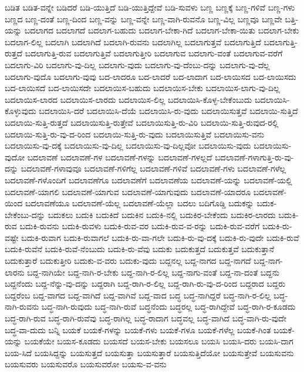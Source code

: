 {ಬಡಿತ
ಬಡಿತ-ವನ್ನೇ
ಬಡಿದರೆ
ಬಡಿ-ಯುತ್ತಿದೆ
ಬಡಿ-ಯುತ್ತಿದ್ದೇವೆ
ಬಡಿ-ಸುವಳು
ಬಣ್ಣ
ಬಣ್ಣಕ್ಕೆ
ಬಣ್ಣ-ಗಳಿವೆ
ಬಣ್ಣ-ಗಳು
ಬಣ್ಣದ
ಬಣ್ಣ-ದಂತೆ
ಬಣ್ಣ-ದಿಂದ
ಬಣ್ಣ-ವನ್ನು
ಬಣ್ಣ-ವನ್ನೇ
ಬಣ್ಣ-ವಾಗಿ-ರುವನೊ
ಬಣ್ಣ-ವಿಲ್ಲ
ಬಣ್ಣವೂ
ಬಣ್ಣವೇ
ಬತ್ತಿ-ಯನ್ನು
ಬದಲಾಗದ
ಬದಲಾಗದೆ
ಬದಲಾಗ-ಬಹುದು
ಬದಲಾಗ-ಬೇಕಾ-ಗಿದೆ
ಬದಲಾಗ-ಬೇಕಾ-ಯಿತು
ಬದಲಾಗ-ಬೇಕು
ಬದಲಾಗ-ಲಿಲ್ಲ
ಬದಲಾಗಿ
ಬದಲಾಗಿದೆ
ಬದಲಾಗಿ-ರುವನು
ಬದಲಾಗಿಲ್ಲ
ಬದಲಾಗುತ್ತವೆ
ಬದಲಾಗುತ್ತಿದೆ
ಬದಲಾಗುತ್ತಿ-ರುತ್ತದೆ
ಬದಲಾಗುತ್ತಿ-ರುವ
ಬದಲಾಗುತ್ತಿವೆ
ಬದಲಾಗುತ್ತೀರಿ
ಬದಲಾಗುವ
ಬದಲಾಗು-ವಂತೆ
ಬದಲಾಗುವ-ವರೆಗೆ
ಬದಲಾಗು-ವಿರಿ
ಬದಲಾಗು-ವು-ದಿಲ್ಲ
ಬದಲಾಗು-ವುದು
ಬದಲಾಗು-ವು-ದೆಂಬು-ದನ್ನು
ಬದಲಾಗು-ವು-ದೆಲ್ಲ
ಬದಲಾಗು-ವುದೊ
ಬದಲಾಗು-ವುವು
ಬದ-ಲಾದರೂ
ಬದ-ಲಾದರೆ
ಬದ-ಲಾದಾಗ
ಬದ-ಲಾಯಿಸದ
ಬದ-ಲಾಯಿಸದು
ಬದ-ಲಾಯಿಸದೆ
ಬದ-ಲಾಯಿಸದೇ
ಬದಲಾಯಿಸ-ಬಹುದು
ಬದಲಾಯಿಸ-ಬೇಕು
ಬದಲಾಯಿಸ-ಲಾಗು-ವು-ದಿಲ್ಲ
ಬದಲಾಯಿಸ-ಲಾರದ
ಬದಲಾಯಿಸ-ಲಾರದು
ಬದಲಾಯಿಸ-ಲಿಲ್ಲ
ಬದಲಾಯಿಸಿ-ಕೊಳ್ಳ-ಬೇಕೆಂಬುದು
ಬದಲಾಯಿಸಿ-ಕೊಳ್ಳುವುದು
ಬದಲಾಯಿಸಿ-ದರೆ
ಬದಲಾಯಿಸಿ-ದೆಯೆ
ಬದಲಾಯಿಸಿ-ರು-ವುದು
ಬದಲಾಯಿಸುತ್ತವೆ
ಬದಲಾಯಿ-ಸುತ್ತಿದೆ
ಬದಲಾಯಿ-ಸುತ್ತಿ-ರುತ್ತದೆ
ಬದಲಾಯಿಸುತ್ತಿ-ರುತ್ತೇವೆ
ಬದಲಾಯಿಸುತ್ತಿ-ರು-ವಿರಿ
ಬದಲಾಯಿ-ಸುತ್ತಿ-ರುವುದ-ರಲ್ಲಿ
ಬದಲಾಯಿ-ಸುತ್ತಿ-ರು-ವು-ದ-ರಿಂದ
ಬದಲಾಯಿ-ಸುತ್ತಿ-ರು-ವುದು
ಬದಲಾಯಿಸುತ್ತಿವೆ
ಬದಲಾಯಿಸು-ವನು
ಬದಲಾಯಿಸು-ವು-ದಕ್ಕೆ
ಬದಲಾಯಿಸು-ವು-ದಿಲ್ಲ
ಬದಲಾಯಿಸು-ವು-ದಿಲ್ಲವೋ
ಬದಲಾಯಿಸು-ವುದು
ಬದಲಾಯಿಸು-ವುದೋ
ಬದಲಾವಣೆ
ಬದಲಾವಣೆ-ಗಳ
ಬದಲಾವಣೆ-ಗಳನ್ನು
ಬದಲಾವಣೆ-ಗಳಲ್ಲದೆ
ಬದಲಾವಣೆ-ಗಳಾಗುತ್ತಿ-ರು-ವು-ದನ್ನು
ಬದಲಾವಣೆ-ಗಳಾವುವೂ
ಬದಲಾವಣೆ-ಗಳಿಗೆಲ್ಲ
ಬದಲಾವಣೆ-ಗಳಿವೆ
ಬದಲಾವಣೆ-ಗಳು
ಬದಲಾವಣೆ-ಗಳೆಲ್ಲ
ಬದಲಾವಣೆ-ಗಳೊಂದಿಗೆ
ಬದಲಾವಣೆಗೂ
ಬದಲಾವಣೆಗೆ
ಬದಲಾವಣೆಯ
ಬದಲಾವಣೆ-ಯನ್ನು
ಬದಲಾವಣೆ-ಯಲ್ಲಿ
ಬದಲಾವಣೆ-ಯಾಗಲಿ
ಬದಲಾವಣೆ-ಯಾಗುವ
ಬದಲಾವಣೆ-ಯಾಗುವುದು
ಬದಲಾವಣೆ-ಯಾದರೂ
ಬದಲಾವಣೆ-ಯಿಂದ
ಬದಲಾವಣೆಯೂ
ಬದಲಾವಣೆ-ಯೆಲ್ಲ
ಬದಲಾವಣೆ-ಯೆಲ್ಲಾ
ಬದಲು
ಬದಿಗೊಡ್ಡಿ
ಬದುಕನ್ನು
ಬದುಕ-ಬೇಕೆಂಬು-ದನ್ನು
ಬದುಕಲು
ಬದುಕಿ
ಬದುಕಿದೆ
ಬದುಕಿನ
ಬದುಕಿ-ನಲ್ಲಿ
ಬದುಕಿರ-ಬೇಕೆಂದು
ಬದುಕಿರ-ಲಾರದು
ಬದುಕಿ-ರುವ
ಬದುಕಿ-ರುವನು
ಬದುಕಿ-ರುವಳು
ಬದುಕಿ-ರುವ-ವರ
ಬದುಕಿ-ರುವ-ವ-ರನ್ನು
ಬದುಕಿ-ರುವ-ವರೆಗೆ
ಬದುಕಿ-ರು-ವಷ್ಟೇ
ಬದುಕಿ-ರುವಾಗ
ಬದುಕಿ-ರುವಾಗಲೆ
ಬದುಕಿ-ರು-ವಾ-ಗಲೇ
ಬದುಕಿ-ರು-ವು-ದಕ್ಕೆ
ಬದುಕಿ-ರು-ವುದೇ
ಬದುಕಿ-ರುವೆ
ಬದುಕಿ-ರುವೆನೆ
ಬದುಕಿ-ರುವೆ-ನೆಂಬುದು
ಬದುಕಿ-ರು-ವೆವು
ಬದುಕು
ಬದುಕುತ್ತದೆ
ಬದುಕುತ್ತವೆ
ಬದುಕುತ್ತಾನೆ
ಬದುಕುತ್ತಾರೆ
ಬದುಕುತ್ತೀರಿ
ಬದುಕು-ವ-ವರು
ಬದುಕು-ವುದು
ಬದ್ದನಲ್ಲ
ಬದ್ದ-ನಾಗದ
ಬದ್ದ-ನಾಗದೆ
ಬದ್ದ-ನಾಗ-ಲಾರನು
ಬದ್ದ-ನಾಗಿಯೇ
ಬದ್ದ-ನಾಗಿ-ರ-ಬೇಕು
ಬದ್ದ-ನಾಗಿ-ರ-ಲಿಲ್ಲ
ಬದ್ದ-ನಾಗು-ವಂತೆ
ಬದ್ದ-ನಾ-ದಂತೆ
ಬದ್ದನು
ಬದ್ದನೆಂದು
ಬದ್ದ-ನೆನ್ನು-ವು-ದನ್ನು
ಬದ್ದರಾಗಿ
ಬದ್ದ-ರಾಗಿ-ರ-ಲಿಲ್ಲ
ಬದ್ದ-ರಾಗಿ-ರು-ವು-ದ-ರಿಂದ
ಬದ್ದರಾದ
ಬದ್ದರು
ಬದ್ದರೆಂಬ
ಬದ್ದ-ವಾಗದ
ಬದ್ದ-ವಾಗಿದೆ
ಬದ್ದ-ವಾಗಿವೆ
ಬದ್ದ-ವಾದ
ಬದ್ಧ
ಬದ್ಧ-ನಾಗಿದ್ದರೆ
ಬದ್ಧ-ನಾಗಿ-ರ-ಲಿಲ್ಲ
ಬದ್ಧ-ನಾಗಿ-ರುವನು
ಬದ್ಧ-ನಾಗಿ-ರುವುದು
ಬದ್ಧ-ನಾಗಿ-ರುವೆ
ಬದ್ಧನೆಂದು
ಬದ್ಧರಲ್ಲ
ಬದ್ಧ-ರಾಗಿದ್ದೇವೆ
ಬದ್ಧ-ರಾಗಿ-ರ-ಕೂಡದು
ಬದ್ಧ-ರಾಗಿ-ರುವ
ಬದ್ಧ-ರಾಗಿ-ರುವೆವು
ಬದ್ಧ-ರಾಗಿಲ್ಲ
ಬದ್ಧ-ರಾದಾಗ
ಬದ್ಧವಲ್ಲ
ಬದ್ಧ-ವಾಗಿದೆ
ಬದ್ಧ-ವಾಗಿ-ರು-ವುದೇ
ಬದ್ಧ-ವಾ-ದುದು
ಬನ್ನಿ
ಬಯಕೆ
ಬಯಕೆ-ಗಳನ್ನು
ಬಯಕೆ-ಗಳು
ಬಯಕೆ-ಗಳೂ
ಬಯಕೆ-ಗಳೆಲ್ಲ
ಬಯಕೆ-ಗಿಂತ
ಬಯಕೆ-ಯನ್ನು
ಬಯಕೆಯೇ
ಬಯಸ-ಕೂಡದು
ಬಯಸದೆ
ಬಯಸ-ಬೇಕು
ಬಯಸಲೂ
ಬಯಸಿ
ಬಯಸಿ-ದರು
ಬಯಸಿ-ದಾಗ
ಬಯ-ಸಿದೆ
ಬಯಸಿದ್ದನ್ನು
ಬಯಸುತ್ತದೆ
ಬಯಸುತ್ತಾ
ಬಯಸುತ್ತಾರೆ
ಬಯಸುತ್ತಿದೆಯೋ
ಬಯಸುತ್ತೇವೆ
ಬಯಸುವನು
ಬಯಸುವರು
ಬಯಸುವರೊ
ಬಯಸುವರೋ
ಬಯಸು-ವ-ವನು
}
